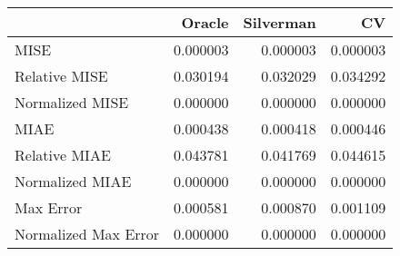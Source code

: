\begin{tabular}{lrrr}
  \hline
 & Oracle & Silverman & CV \\ 
  \hline
MISE & 0.000003 & 0.000003 & 0.000003 \\ 
  Relative MISE & 0.030194 & 0.032029 & 0.034292 \\ 
  Normalized MISE & 0.000000 & 0.000000 & 0.000000 \\ 
  MIAE & 0.000438 & 0.000418 & 0.000446 \\ 
  Relative MIAE & 0.043781 & 0.041769 & 0.044615 \\ 
  Normalized MIAE & 0.000000 & 0.000000 & 0.000000 \\ 
  Max Error & 0.000581 & 0.000870 & 0.001109 \\ 
  Normalized Max Error & 0.000000 & 0.000000 & 0.000000 \\ 
   \hline
\end{tabular}
